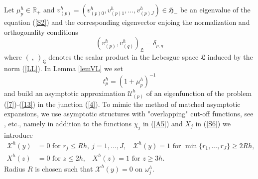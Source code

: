 \documentclass[11pt]{article}%
\numberwithin{equation}{section}
\begin{document}
Let $\mu_{p}^{h}\in\mathbb{R}_{+}$ and $v_{(p)}^{h}=(v_{(p)0}^{h},v_{(p)1}%
^{h},...,v_{(p)J}^{h})\in\mathfrak{H}_{-}$ be an eigenvalue of the equation
(\ref{S2}) and the corresponding eigenvector enjoing the normalization and
orthogonality conditions%
\begin{equation}
(v_{(p)}^{h},v_{(q)}^{h})_{\mathfrak{L}}=\delta_{p,q} \label{E10}%
\end{equation}
where $(\ ,\ )_{\mathfrak{L}}$ denotes the scalar product in the Lebesgue
space $\mathfrak{L}$ induced by the norm (\ref{LL}). In Lemma \ref{lemVL} we
set%
\begin{equation}
t_{p}^{h}=(1+\mu_{p}^{h})^{-1} \label{E11}%
\end{equation}
and build an asymptotic approximation $\mathcal{U}_{(p)}^{h}$ of an
eigenfunction of the problem (\ref{7})-(\ref{13}) in the junction (\ref{4}).
To mimic the method of matched asymptotic expansions, we use asymptotic
structures with "overlapping" cut-off functions, see \cite[Ch.2]{MaNaPl},
\cite{na239, na344} etc., namely in addition to the functions $\chi_{j}$ in
(\ref{A5}) and $X_{j}$ in (\ref{S6}) we introduce%
\begin{align}
\mathcal{X}^{h}(y)  &  =0\text{ for }r_{j}\leq
Rh,\ j=1,...,J,\ \ \ \ \mathcal{X}^{h}(y)=1\text{ for }\min\{r_{1}%
,...,r_{J}\}\geq2Rh,\label{E12}\\
X^{h}(z)  &  =0\text{ for }z\leq2h,\ \ \ \ X^{h}(z)=1\text{ for }%
z\geq3h.\nonumber
\end{align}
Radius $R$ is chosen such that $\mathcal{X}^{h}(y)=0$ on $\omega_{j}^{h}.$
\end{document}
